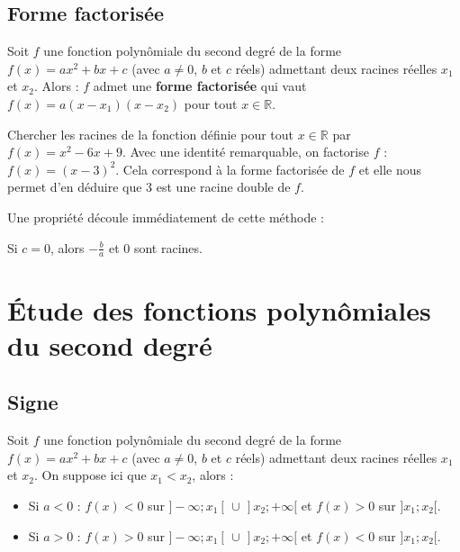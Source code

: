 	\subsection{Forme factorisée}
	
	\begin{formula}[Définition]
		Soit $f$ une fonction polynômiale du second degré de la forme $f(x) = ax^2 + bx +c$ (avec $a \neq 0$, $b$ et $c$ réels) admettant deux racines réelles $x_1$ et $x_2$. Alors :
		\newpar
		$f$ admet une \textbf{forme factorisée} qui vaut $f(x) = a(x-x_1)(x-x_2)$ pour tout $x \in \mathbb{R}$.
	\end{formula}
	
	\begin{tip}[Exemple]
		Chercher les racines de la fonction définie pour tout $x \in \mathbb{R}$ par $f(x) = x^2 - 6x + 9$.
		\newpar
		Avec une identité remarquable, on factorise $f$ : $f(x) = (x - 3)^2$.
		\newpar
		Cela correspond à la forme factorisée de $f$ et elle nous permet d'en déduire que $3$ est une racine double de $f$.
	\end{tip}
	
	Une propriété découle immédiatement de cette méthode :
	
	\begin{formula}[Propriété]
		Si $c = 0$, alors $-\frac{b}{a}$ et $0$ sont racines.
	\end{formula}
	
	\section{Étude des fonctions polynômiales du second degré}
	
	\subsection{Signe}
	
	\begin{formula}
		Soit $f$ une fonction polynômiale du second degré de la forme $f(x) = ax^2 + bx +c$ (avec $a \neq 0$, $b$ et $c$ réels) admettant deux racines réelles $x_1$ et $x_2$. On suppose ici que $x_1 < x_2$, alors :
		\begin{itemize}
			\item Si $a < 0$ : $f(x) < 0$ sur $]-\infty; x_1[ \, \cup \, ]x_2; +\infty[$ et $f(x) > 0$ sur $]x_1; x_2[$.
			\item Si $a > 0$ : $f(x) > 0$ sur $]-\infty; x_1[ \, \cup \, ]x_2; +\infty[$ et $f(x) < 0$ sur $]x_1; x_2[$.
		\end{itemize}
	\end{formula}
	
